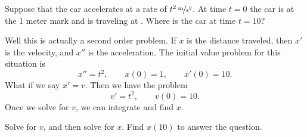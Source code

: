 \documentclass{ximera}
\begin{document}
\begin{example}
    Suppose that the car accelerates at a rate of $\unitfrac[t^2]{m}{s^2}$. At time $t=0$ the car is at the 1 meter mark and is traveling at .  Where is the car at time $t=10$?
\end{example}
\begin{exampleSol}
    Well this is actually a second order problem.  If $x$ is the distance traveled, then $x'$ is the velocity, and $x''$ is the acceleration. The initial value problem for this situation is
    \begin{equation*}
        x'' = t^2 , \qquad x(0) = 1 , \qquad x'(0) = 10 .
    \end{equation*}
    What if we say $x' = v$.  Then we have the problem
    \begin{equation*}
        v' = t^2, \qquad v(0) = 10 .
    \end{equation*}
    Once we solve for $v$, we can integrate and find $x$.
\end{exampleSol}

\begin{exercise}
    Solve for $v$, and then solve for $x$.  Find $x(10)$ to answer the question.
\end{exercise}
\end{document}
